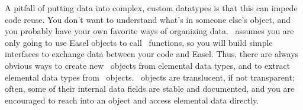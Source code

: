 A pitfall of putting data into complex, custom datatypes is that this
can impede code reuse. You don't want to understand what's in someone
else's object, and you probably have your own favorite ways of
organizing data.  \Easel\ assumes you are only going to use Easel
objects to call \Easel\ functions, so you will build simple interfaces
to exchange data between your code and Easel. Thus, there are always
obvious ways to create new \Easel\ objects from elemental data types,
and to extract elemental data types from \Easel\ objects. \Easel\ objects
are translucent, if not transparent; often, some of their internal
data fields are stable and documented, and you are encouraged to reach
into an object and access elemental data directly.


